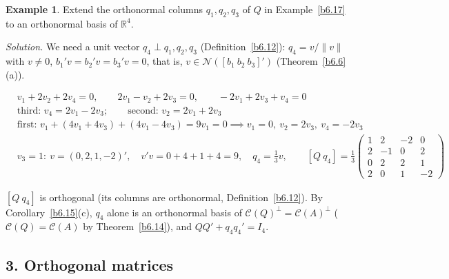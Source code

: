 \documentclass[12pt]{article}
\newcommand{\R}{\mathbb R}
\theoremstyle{definition}
\newtheorem{example}[theorem]{Example}
\newcommand{\boardtop}{\vspace*{-\abovedisplayskip}}
\begin{document}
\begin{example}\label{b6.18}
Extend the orthonormal columns \(q_1,q_2,q_3\) of \(Q\) in Example~\ref{b6.17} to an orthonormal basis of \(\R^4\).
\end{example}
\textit{Solution.} We need a unit vector \(q_4\perp q_1,q_2,q_3\) (Definition~\ref{b6.12}): \(q_4=v/\lVert v\rVert\) with
\(v\ne0\), \(b_1'v=b_2'v=b_3'v=0\), that is, \(v\in\mathcal N([b_1\ b_2\ b_3]')\) (Theorem~\ref{b6.6}(a)).
\begin{board}
\boardtop
\begin{align*}
&v_1+2v_2+2v_4=0,\qquad2v_1-v_2+2v_3=0,\qquad-2v_1+2v_3+v_4=0\\
&\text{third: }v_4=2v_1-2v_3;\qquad\text{second: }v_2=2v_1+2v_3\\
&\text{first: }v_1+(4v_1+4v_3)+(4v_1-4v_3)=9v_1=0\implies v_1=0,\ v_2=2v_3,\ v_4=-2v_3\\
&v_3=1\colon\ v=(0,2,1,-2)',\quad v'v=0+4+1+4=9,\quad q_4=\tfrac13v,\qquad
[Q\ q_4]=\frac13\begin{pmatrix}1&2&-2&0\\2&-1&0&2\\0&2&2&1\\2&0&1&-2\end{pmatrix}
\end{align*}
\end{board}
\([Q\ q_4]\) is orthogonal (its columns are orthonormal, Definition~\ref{b6.12}). By Corollary~\ref{b6.15}(c), \(q_4\) alone is an orthonormal basis of
\(\mathcal C(Q)^\perp=\mathcal C(A)^\perp\) (\(\mathcal C(Q)=\mathcal C(A)\) by Theorem~\ref{b6.14}), and
\(QQ'+q_4q_4'=I_4\).

\subsection*{3. Orthogonal matrices}
\end{document}
